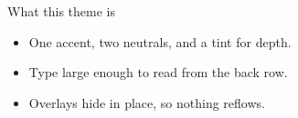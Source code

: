\documentclass[aspectratio=169]{slides}
\begin{document}
\begin{frame}{What this theme is}
  \begin{itemize}
    \item<1-> One accent, two neutrals, and a tint for depth.
    \item<2-> Type large enough to read from the back row.
    \item<3-> Overlays hide in place, so nothing reflows.
  \end{itemize}
\end{frame}
\end{document}
